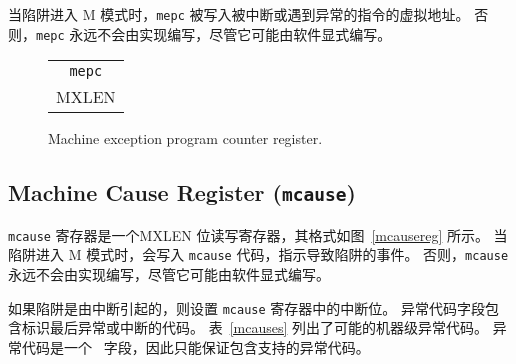 \iffalse
When a trap is taken into M-mode, {\tt mepc} is written with the
virtual address of the instruction that was interrupted or that
encountered the exception.  Otherwise, {\tt mepc} is never written by
the implementation, though it may be explicitly written by software.
\fi

当陷阱进入 M 模式时，{\tt mepc} 被写入被中断或遇到异常的指令的虚拟地址。 否则，{\tt mepc} 永远不会由实现编写，尽管它可能由软件显式编写。

\begin{figure}[h!]
{\footnotesize
\begin{center}
\begin{tabular}{@{}J}
 \\
\hline
{} \\
\hline
MXLEN \\
\end{tabular}
\end{center}
}
\vspace{-0.1in}
\caption{Machine exception program counter register.}
\label{mepcreg}
\end{figure}

\subsection{Machine Cause Register ({\tt mcause})}
\label{sec:mcause}

\iffalse
The {\tt mcause} register is an MXLEN-bit read-write register formatted as
shown in Figure~\ref{mcausereg}.  When a trap is taken into M-mode, {\tt
mcause} is written with a code indicating the event that caused the trap.
Otherwise, {\tt mcause} is never written by the implementation, though it may be
explicitly written by software.

The Interrupt bit in the {\tt mcause} register is set if the
trap was caused by an interrupt. The Exception Code field
 contains a code identifying the last exception or interrupt.  Table~\ref{mcauses}
lists the possible machine-level exception codes.  The Exception Code
is a \wlrl\ field, so is only guaranteed to hold supported exception
codes.
\fi

{\tt mcause} 寄存器是一个MXLEN 位读写寄存器，其格式如图~\ref{mcausereg} 所示。 当陷阱进入 M 模式时，会写入 {\tt mcause} 代码，指示导致陷阱的事件。 否则，{\tt mcause} 永远不会由实现编写，尽管它可能由软件显式编写。

如果陷阱是由中断引起的，则设置 {\tt mcause} 寄存器中的中断位。 异常代码字段包含标识最后异常或中断的代码。 表~\ref{mcauses} 列出了可能的机器级异常代码。 异常代码是一个 \wlrl\ 字段，因此只能保证包含支持的异常代码。

